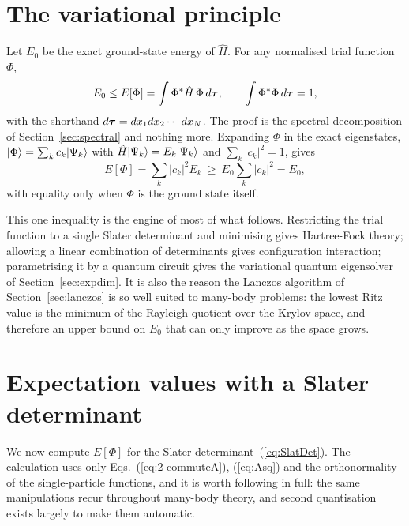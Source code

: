 \section{The variational principle}
\label{sec:variational}

Let $E_0$ be the exact ground-state energy of $\hat{H}$.  For any normalised
trial function $\Phi$,
\begin{equation}
  E_0 \le E[\Phi] = \int \Phi^{*}\hat{H}\,\Phi\,d\bm{\tau},
  \qquad
  \int \Phi^{*}\Phi\,d\bm{\tau} = 1,
  \label{eq:2-variational}
\end{equation}
with the shorthand $d\bm{\tau}=dx_1dx_2\cdots dx_N$.  The proof
is the spectral decomposition of Section~\ref{sec:spectral} and nothing more.
Expanding $\Phi$ in the exact eigenstates,
$\vert \Phi \rangle=\sum_k c_k\vert \Psi_k \rangle$ with $\hat{H}\vert \Psi_k \rangle=E_k
\vert \Psi_k \rangle$ and $\sum_k|c_k|^2=1$, gives
\begin{equation}
  E[\Phi] = \sum_k |c_k|^2 E_k
          \ \ge\ E_0\sum_k |c_k|^2 = E_0 ,
  \label{eq:2-variationalproof}
\end{equation}
with equality only when $\Phi$ is the ground state itself.

This one inequality is the engine of most of what follows.  Restricting the
trial function to a single Slater determinant and minimising gives
Hartree-Fock theory; allowing a linear combination of determinants gives
configuration interaction; parametrising it by a quantum circuit gives the
variational quantum eigensolver of Section~\ref{sec:expdim}.  It is also the
reason the Lanczos algorithm of Section~\ref{sec:lanczos} is so well suited to
many-body problems: the lowest Ritz value is the minimum of the Rayleigh
quotient over the Krylov space, and therefore an upper bound on $E_0$ that can
only improve as the space grows.

\section{Expectation values with a Slater determinant}
\label{sec:expval}

We now compute $E[\Phi]$ for the Slater determinant~(\ref{eq:SlatDet}).  The
calculation uses only Eqs.~(\ref{eq:2-commuteA}), (\ref{eq:Asq}) and the
orthonormality of the single-particle functions, and it is worth following in
full: the same manipulations recur throughout many-body theory, and second
quantisation exists largely to make them automatic.

